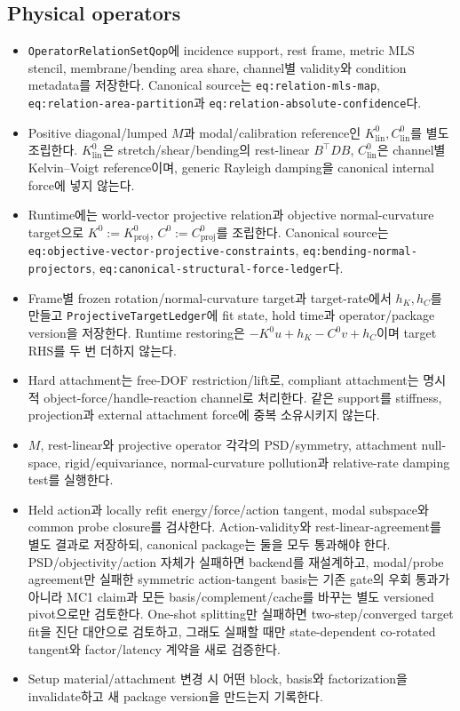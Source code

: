 \documentclass[10pt,a4paper]{article}
\newcommand{\todo}{\textcolor{TodoGray}{\(\square\)}}
\newcommand{\code}[1]{\texttt{#1}}
\begin{document}
\subsection*{Physical operators}

\begin{itemize}
  \item[\todo] \code{OperatorRelationSetQop}에 incidence support, rest frame,
  metric MLS stencil, membrane/bending area share, channel별 validity와 condition metadata를 저장한다.
  Canonical source는 \code{eq:relation-mls-map},
  \code{eq:relation-area-partition}과 \code{eq:relation-absolute-confidence}다.
  \item[\todo] Positive diagonal/lumped \(M\)과 modal/calibration reference인
  \(K_{\mathrm{lin}}^0,C_{\mathrm{lin}}^0\)를 별도 조립한다.
  \(K_{\mathrm{lin}}^0\)은 stretch/shear/bending의 rest-linear
  \(B^\top D B\), \(C_{\mathrm{lin}}^0\)은 channel별 Kelvin--Voigt reference이며,
  generic Rayleigh damping을 canonical internal force에 넣지 않는다.
  \item[\todo] Runtime에는 world-vector projective relation과 objective normal-curvature target으로
  \(K^0:=K_{\mathrm{proj}}^0\), \(C^0:=C_{\mathrm{proj}}^0\)를 조립한다.
  Canonical source는 \code{eq:objective-vector-projective-constraints},
  \code{eq:bending-normal-projectors}, \code{eq:canonical-structural-force-ledger}다.
  \item[\todo] Frame별 frozen rotation/normal-curvature target과 target-rate에서
  \(h_K,h_C\)를 만들고 \code{ProjectiveTargetLedger}에 fit state, hold time과
  operator/package version을 저장한다. Runtime restoring은
  \(-K^0u+h_K-C^0v+h_C\)이며 target RHS를 두 번 더하지 않는다.
  \item[\todo] Hard attachment는 free-DOF restriction/lift로, compliant attachment는
  명시적 object-force/handle-reaction channel로 처리한다. 같은 support를 stiffness, projection과
  external attachment force에 중복 소유시키지 않는다.
  \item[\todo] \(M\), rest-linear와 projective operator 각각의 PSD/symmetry,
  attachment null-space, rigid/equivariance, normal-curvature pollution과 relative-rate damping test를 실행한다.
  \item[\todo] Held action과 locally refit energy/force/action tangent, modal subspace와
  common probe closure를 검사한다. Action-validity와 rest-linear-agreement를 별도 결과로 저장하되,
  canonical package는 둘을 모두 통과해야 한다. PSD/objectivity/action 자체가 실패하면 backend를 재설계하고,
  modal/probe agreement만 실패한 symmetric action-tangent basis는 기존 gate의 우회 통과가 아니라
  MC1 claim과 모든 basis/complement/cache를 바꾸는 별도 versioned pivot으로만 검토한다.
  One-shot splitting만 실패하면 two-step/converged target fit을 진단 대안으로 검토하고,
  그래도 실패할 때만 state-dependent co-rotated tangent와 factor/latency 계약을 새로 검증한다.
  \item[\todo] Setup material/attachment 변경 시 어떤 block, basis와 factorization을 invalidate하고 새 package version을 만드는지 기록한다.
\end{itemize}
\end{document}
